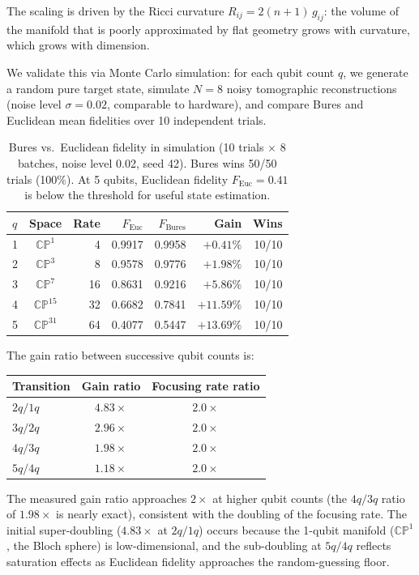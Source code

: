\documentclass[12pt,a4paper]{article}
\begin{document}
The scaling is driven by the Ricci curvature $R_{ij} = 2(n+1)\,g_{ij}$: the volume of the manifold that is poorly approximated by flat geometry grows with curvature, which grows with dimension.

We validate this via Monte Carlo simulation: for each qubit count $q$, we generate a random pure target state, simulate $N = 8$ noisy tomographic reconstructions (noise level $\sigma = 0.02$, comparable to hardware), and compare Bures and Euclidean mean fidelities over 10 independent trials.

\begin{table}[H]
\centering
\begin{tabular}{lcrrrrr}
\toprule
$q$ & Space & Rate & $F_{\text{Euc}}$ & $F_{\text{Bures}}$ & Gain & Wins \\
\midrule
1 & $\mathbb{CP}^1$ & 4 & 0.9917 & 0.9958 & $+0.41\%$ & 10/10 \\
2 & $\mathbb{CP}^3$ & 8 & 0.9578 & 0.9776 & $+1.98\%$ & 10/10 \\
3 & $\mathbb{CP}^7$ & 16 & 0.8631 & 0.9216 & $+5.86\%$ & 10/10 \\
4 & $\mathbb{CP}^{15}$ & 32 & 0.6682 & 0.7841 & $+11.59\%$ & 10/10 \\
5 & $\mathbb{CP}^{31}$ & 64 & 0.4077 & 0.5447 & $+13.69\%$ & 10/10 \\
\bottomrule
\end{tabular}
\caption{Bures vs.\ Euclidean fidelity in simulation (10 trials $\times$ 8 batches, noise level 0.02, seed 42). Bures wins 50/50 trials (100\%). At 5 qubits, Euclidean fidelity $F_{\text{Euc}} = 0.41$ is below the threshold for useful state estimation.}
\label{tab:scaling}
\end{table}

The gain ratio between successive qubit counts is:
\begin{center}
\begin{tabular}{lcc}
\toprule
Transition & Gain ratio & Focusing rate ratio \\
\midrule
$2q/1q$ & $4.83\times$ & $2.0\times$ \\
$3q/2q$ & $2.96\times$ & $2.0\times$ \\
$4q/3q$ & $1.98\times$ & $2.0\times$ \\
$5q/4q$ & $1.18\times$ & $2.0\times$ \\
\bottomrule
\end{tabular}
\end{center}

The measured gain ratio approaches $2\times$ at higher qubit counts (the $4q/3q$ ratio of $1.98\times$ is nearly exact), consistent with the doubling of the focusing rate. The initial super-doubling ($4.83\times$ at $2q/1q$) occurs because the 1-qubit manifold ($\mathbb{CP}^1$, the Bloch sphere) is low-dimensional, and the sub-doubling at $5q/4q$ reflects saturation effects as Euclidean fidelity approaches the random-guessing floor.
\end{document}
